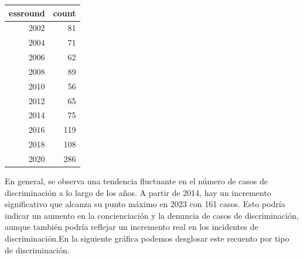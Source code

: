 \documentclass{article}
\begin{document}
\begin{table}[ht]
\centering
\begin{tabular}{rr}
  \hline
essround & count \\ 
  \hline
2002 &  81 \\ 
  2004 &  71 \\ 
  2006 &  62 \\ 
  2008 &  89 \\ 
  2010 &  56 \\ 
  2012 &  65 \\ 
  2014 &  75 \\ 
  2016 & 119 \\ 
  2018 & 108 \\ 
  2020 & 286 \\ 
   \hline
\end{tabular}
\end{table}
En general, se observa una tendencia fluctuante en el número de casos de discriminación a lo largo de los años. A partir de 2014, hay un incremento significativo que alcanza su punto máximo en 2023 con 161 casos. Esto podría indicar un aumento en la concienciación y la denuncia de casos de discriminación, aunque también podría reflejar un incremento real en los incidentes de discriminación.En la siguiente gráfica podemos desglosar este recuento por tipo de discriminación. 
\end{document}
